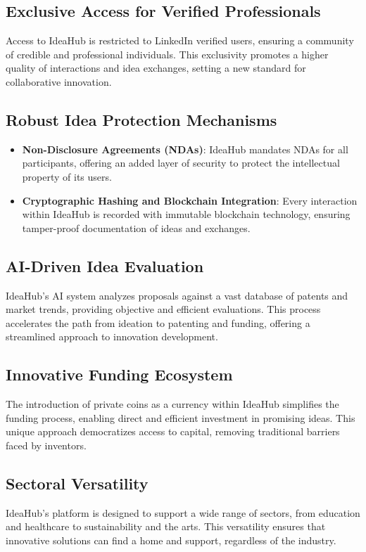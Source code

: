 \documentclass{article}
\begin{document}
	\subsection{Exclusive Access for Verified Professionals}
	Access to IdeaHub is restricted to LinkedIn verified users, ensuring a community of credible and professional individuals. This exclusivity promotes a higher quality of interactions and idea exchanges, setting a new standard for collaborative innovation.
	
	\subsection{Robust Idea Protection Mechanisms}
	\begin{itemize}
		\item \textbf{Non-Disclosure Agreements (NDAs)}: IdeaHub mandates NDAs for all participants, offering an added layer of security to protect the intellectual property of its users.
		\item \textbf{Cryptographic Hashing and Blockchain Integration}: Every interaction within IdeaHub is recorded with immutable blockchain technology, ensuring tamper-proof documentation of ideas and exchanges.
	\end{itemize}
	
	\subsection{AI-Driven Idea Evaluation}
	IdeaHub's AI system analyzes proposals against a vast database of patents and market trends, providing objective and efficient evaluations. This process accelerates the path from ideation to patenting and funding, offering a streamlined approach to innovation development.
	
	\subsection{Innovative Funding Ecosystem}
	The introduction of private coins as a currency within IdeaHub simplifies the funding process, enabling direct and efficient investment in promising ideas. This unique approach democratizes access to capital, removing traditional barriers faced by inventors.
	
	\subsection{Sectoral Versatility}
	IdeaHub's platform is designed to support a wide range of sectors, from education and healthcare to sustainability and the arts. This versatility ensures that innovative solutions can find a home and support, regardless of the industry.
	
\end{document}
